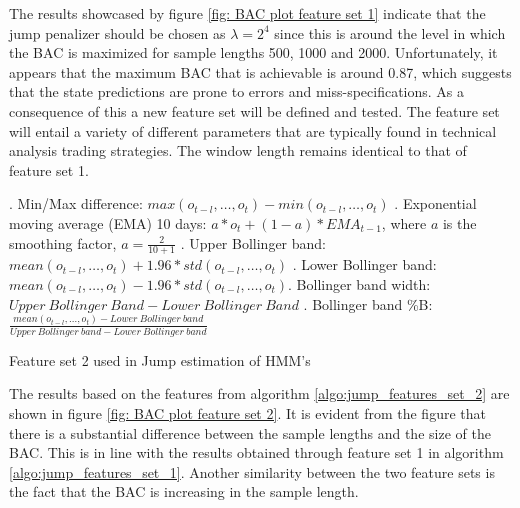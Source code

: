 The results showcased by figure \ref{fig: BAC plot feature set 1} indicate that the jump penalizer should be chosen as $\lambda = 2^4$ since this is around the level in which the BAC is maximized for sample lengths 500, 1000 and 2000. Unfortunately, it appears that the maximum BAC that is achievable is around 0.87, which suggests that the state predictions are prone to errors and miss-specifications. As a consequence of this a new feature set will be defined and tested. The feature set will entail a variety of different parameters that are typically found in technical analysis trading strategies. The window length remains identical to that of feature set 1.

\begin{algorithm}[H]
. Min/Max difference: $max(o_{t-l},\ldots,o_{t}) - min(o_{t-l},\ldots,o_{t})$ . Exponential moving average (EMA) 10 days: $a * o_t + (1-a) * EMA_{t-1}$, \quad where $a$ is the smoothing factor, $a = \frac{2}{10+1}$ . Upper Bollinger band: $mean(o_{t-l},\ldots,o_t) + 1.96 * std(o_{t-l},\ldots,o_t)$ . Lower Bollinger band: $mean(o_{t-l},\ldots,o_t) - 1.96 * std(o_{t-l},\ldots,o_t)$. Bollinger band width: $Upper\ Bollinger\ Band - Lower\  Bollinger\ Band$ . Bollinger band \%B: $\frac{mean(o_{t-l},\ldots,o_{t}) - Lower\ Bollinger\ band} {Upper\ Bollinger\ band - Lower\ Bollinger\ band}$  \;
\BlankLine
{}
\caption{Feature set 2 used in Jump estimation of HMM's}
\label{algo:jump_features_set_2}
\end{algorithm}

The results based on the features from algorithm \ref{algo:jump_features_set_2} are shown in figure \ref{fig: BAC plot feature set 2}. It is evident from the figure that  there is a substantial difference between the sample lengths and the size of the BAC. This is in line with the results obtained through feature set 1 in algorithm \ref{algo:jump_features_set_1}. Another similarity between the two feature sets is the fact that the BAC is increasing in the sample length.


